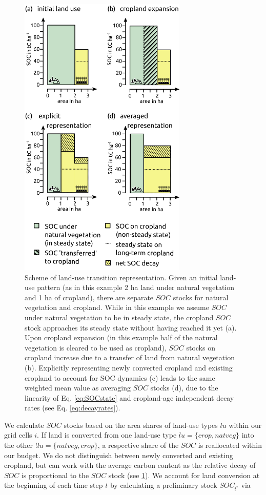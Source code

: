 \documentclass[gc, manuscript]{copernicus}
\begin{document}
\begin{figure}[h]
\includegraphics[width=8cm]{../ResultNotebooks/Output/Images/LUtransitions} \caption{Scheme of land-use transition representation. Given an initial land-use pattern (as in this example 2 ha land under natural vegetation and 1 ha of cropland), there are separate $SOC$ stocks for natural vegetation and cropland. While in this example we assume $SOC$ under natural vegetation to be in steady state, the cropland $SOC$ stock approaches its steady state without having reached it yet (a). Upon cropland expansion (in this example half of the natural vegetation is cleared to be used as cropland), $SOC$ stocks on cropland increase due to a transfer of land from natural vegetation (b). Explicitly representing newly converted cropland and existing cropland to account for SOC dynamics (c) leads to the same weighted mean value as averaging $SOC$ stocks (d), due to the linearity of Eq. \ref{eq:SOCstate} and cropland-age independent decay rates (see Eq. \ref{eq:decayrates}).}\label{fig:LUtrans}
\end{figure}

We calculate \(SOC\) stocks based on the area shares of land-use types \(lu\) within our grid cells \(i\). If land is converted from one land-use type \(lu=\{crop,natveg\}\) into the other \(!lu=\{natveg,crop\}\), a respective share of the \(SOC\) is reallocated within our budget. We do not distinguish between newly converted and existing cropland, but can work with the average carbon content as the relative decay of \(SOC\) is proportional to the \(SOC\) stock (see \ref{fig:LUtrans}). We account for land conversion at the beginning of each time step \(t\) by calculating a preliminary stock \(SOC_{t^*}\) via
\end{document}
